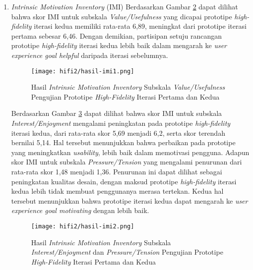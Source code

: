 \begin{enumerate}
  \begin{figure}[h]
    \centering
    \texttt{[image: hifi2/hasil-sus-efficiency.png]}
    \caption{Jawaban \textit{System Usability Scale} Pertanyaan Nomor 2, 3, dan 8 untuk Prototipe \textit{High-Fidelity} Iterasi Pertama}
    \label{img:sus_eff_2}
  \end{figure}
  \FloatBarrier

  \item \textit{Intrinsic Motivation Inventory} (IMI)
  \subitem  Berdasarkan Gambar \ref{img:imi1_2} dapat dilihat bahwa skor IMI untuk subskala \textit{Value/Usefulness} yang dicapai prototipe \textit{high-fidelity} iterasi kedua memiliki rata-rata 6,89, meningkat dari prototipe iterasi pertama sebesar 6,46. Dengan demikian, partisipan setuju rancangan prototipe \textit{high-fidelity} iterasi kedua lebih baik dalam mengarah ke \textit{user experience goal helpful} daripada iterasi sebelumnya.
  
  \begin{figure}[h]
    \centering
    \texttt{[image: hifi2/hasil-imi1.png]}
    \caption{Hasil \textit{Intrinsic Motivation Inventory} Subskala \textit{Value/Usefulness} Pengujian Prototipe \textit{High-Fidelity} Iterasi Pertama dan Kedua}
    \label{img:imi1_2}
  \end{figure}
  \FloatBarrier
  
  \subitem  Berdasarkan Gambar \ref{img:imi2_2} dapat dilihat bahwa skor IMI untuk subskala \textit{Interest/Enjoyment} mengalami peningkatan pada prototipe \textit{high-fidelity} iterasi kedua, dari rata-rata skor 5,69 menjadi 6,2, serta skor terendah bernilai 5,14. Hal tersebut menunjukkan bahwa perbaikan pada prototipe yang meningkatkan \textit{usability}, lebih baik dalam memotivasi pengguna. Adapun skor IMI untuk subskala \textit{Pressure/Tension} yang mengalami penurunan dari rata-rata skor 1,48 menjadi 1,36. Penurunan ini dapat dilihat sebagai peningkatan kualitas desain, dengan maksud prototipe \textit{high-fidelity} iterasi kedua lebih tidak membuat penggunanya merasa tertekan. Kedua hal tersebut menunjukkan bahwa prototipe iterasi kedua dapat mengarah ke \textit{user experience goal motivating} dengan lebih baik.

  \begin{figure}[h]
    \centering
    \texttt{[image: hifi2/hasil-imi2.png]}
    \caption{Hasil \textit{Intrinsic Motivation Inventory} Subskala \textit{Interest/Enjoyment} dan \textit{Pressure/Tension} Pengujian Prototipe \textit{High-Fidelity} Iterasi Pertama dan Kedua}
    \label{img:imi2_2}
  \end{figure}
  \FloatBarrier

\end{enumerate}